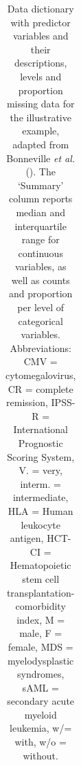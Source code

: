 \documentclass[
  letterpaper,
  paper=240mm:170mm,
  twoside=true,
  open=right,
  fontsize=10pt,
  pagesize=false,
  BCOR=15mm,
  DIV=14,
  headinclude=true,
  footinclude=false,
  headsepline=on]{scrbook}
\begin{document}
\begin{longtable}[t]{>{\raggedright\arraybackslash}p{7em}>{\raggedright\arraybackslash}p{10em}lll}

\caption{\label{tbl-data-dictionary}Data dictionary with predictor
variables and their descriptions, levels and proportion missing data for
the illustrative example, adapted from Bonneville \emph{et al.}
().
The `Summary' column reports median and interquartile range for
continuous variables, as well as counts and proportion per level of
categorical variables. Abbreviations: CMV = cytomegalovirus, CR =
complete remission, IPSS-R = International Prognostic Scoring System, V.
= very, interm. = intermediate, HLA = Human leukocyte antigen, HCT-CI =
Hematopoietic stem cell transplantation-comorbidity index, M = male, F =
female, MDS = myelodysplastic syndromes, sAML = secondary acute myeloid
leukemia, w/= with, w/o = without.}

\tabularnewline


\end{longtable}
\end{document}
